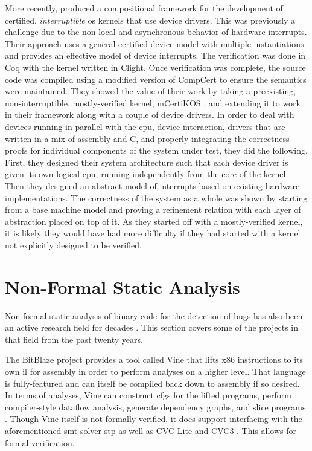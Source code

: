 More recently, \textcite{chen2018compositional} produced a compositional framework
for the development of certified, \emph{interruptible}%
\ac{os} kernels that use device drivers.%
This was previously a challenge due to the non-local and asynchronous behavior
of hardware interrupts. Their approach uses a general certified device model
with multiple instantiations and provides an effective model of device interrupts.
The verification was done in Coq with the kernel written in Clight.
Once verification was complete, the source code was compiled using a modified version
of CompCert to ensure the semantics were maintained.
They showed the value of their work by taking a preexisting,
non-interruptible, mostly-verified kernel, mCertiKOS \autocite{costanzo2016endtoend},
and extending it to work in their framework along with a couple of device drivers.
In order to deal with devices running in parallel with the \ac{cpu},
device interaction, drivers that are written in a mix of assembly and C,
and properly integrating the correctness proofs for individual components
of the system under test, they did the following.
First, they designed their system architecture such that each device driver
is given its own logical \ac{cpu}, running independently from the core of the kernel.
Then they designed an abstract model of interrupts
based on existing hardware implementations.
The correctness of the system as a whole was shown
by starting from a base machine model
and proving a refinement relation with each layer of abstraction placed on top of it.
As they started off with a mostly-verified kernel, it is likely they would have had
more difficulty if they had started with a kernel
not explicitly designed to be verified.

\section{Non-Formal Static Analysis}\label{se:static_analysis}
Non-formal static analysis of binary code for the detection of bugs
has also been an active research field for decades
\autocite{kruegel2005automating,brumley2011bap,wang2017angr}.
This section covers some of the projects in that field from the past twenty years.

The BitBlaze project \autocite{song2008bitblaze,BitBlazeWebSite}
provides a tool called Vine that lifts \gls{x86} instructions to its own \ac{il} for assembly
in order to perform analyses on a higher level.
That language is fully-featured and can itself be compiled back down to assembly
if so desired.
In terms of analyses, Vine can construct \acp{cfg} for the lifted programs,
perform compiler-style dataflow analysis, generate dependency graphs,
and slice programs \autocite{weiser1981slicing,tip1995survey}.
Though Vine itself is not formally verified,
it does support interfacing with the aforementioned \ac{smt} solver \ac{stp}
as well as CVC Lite \autocite{barrett2004cvcl} and CVC3 \autocite{barrett2007cvc3}.
This allows for formal verification.

